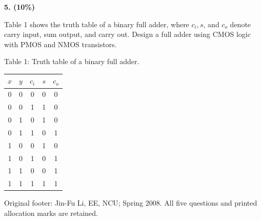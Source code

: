 \documentclass[10pt]{article}
\newcommand{\qheading}[1]{\par\medskip\textbf{#1}\par}
\begin{document}
\qheading{5. (10\%)} Table 1 shows the truth table of a binary full adder, where $c_i,s$, and $c_o$ denote carry input, sum output, and carry out. Design a full adder using CMOS logic with PMOS and NMOS transistors.
\begin{center}\small Table 1: Truth table of a binary full adder.\\
\begin{tabular}{ccccc}\toprule$x$&$y$&$c_i$&$s$&$c_o$\\\midrule
0&0&0&0&0\\0&0&1&1&0\\0&1&0&1&0\\0&1&1&0&1\\
1&0&0&1&0\\1&0&1&0&1\\1&1&0&0&1\\1&1&1&1&1\\\bottomrule\end{tabular}\end{center}
\vfill\small Original footer: Jin-Fu Li, EE, NCU; Spring 2008. All five questions and printed allocation marks are retained.
\end{document}
